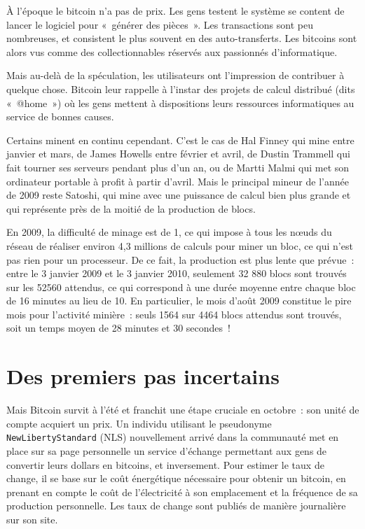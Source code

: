 
À l'époque le bitcoin n'a pas de prix. Les gens testent le système se content de lancer le logiciel pour «~générer des pièces~». Les transactions sont peu nombreuses, et consistent le plus souvent en des auto-transferts. Les bitcoins sont alors vus comme des collectionnables réservés aux passionnés d'informatique.

Mais au-delà de la spéculation, les utilisateurs ont l'impression de contribuer à quelque chose. Bitcoin leur rappelle à l'instar des projets de calcul distribué (dits «~@home~») où les gens mettent à dispositions leurs ressources informatiques au service de bonnes causes.

Certains minent en continu cependant. C'est le cas de Hal Finney qui mine entre janvier et mars, de James Howells entre février et avril, de Dustin Trammell qui fait tourner ses serveurs pendant plus d'un an, ou de Martti Malmi qui met son ordinateur portable à profit à partir d'avril. Mais le principal mineur de l'année de 2009 reste Satoshi, qui mine avec une puissance de calcul bien plus grande et qui représente près de la moitié de la production de blocs.

En 2009, la difficulté de minage est de 1, ce qui impose à tous les nœuds du réseau de réaliser environ 4,3 millions de calculs pour miner un bloc, ce qui n'est pas rien pour un processeur. De ce fait, la production est plus lente que prévue~: entre le 3 janvier 2009 et le 3 janvier 2010, seulement 32 880 blocs sont trouvés sur les 52560 attendus, ce qui correspond à une durée moyenne entre chaque bloc de 16 minutes au lieu de 10. En particulier, le mois d'août 2009 constitue le pire mois pour l'activité minière~: seuls 1564 sur 4464 blocs attendus sont trouvés, soit un temps moyen de 28 minutes et 30 secondes~!


\section{Des premiers pas incertains}

Mais Bitcoin survit à l'été et franchit une étape cruciale en octobre~: son unité de compte acquiert un prix. Un individu utilisant le pseudonyme \verb?NewLibertyStandard? (NLS) nouvellement arrivé dans la communauté met en place sur sa page personnelle un service d'échange permettant aux gens de convertir leurs dollars en bitcoins, et inversement. Pour estimer le taux de change, il se base sur le coût énergétique nécessaire pour obtenir un bitcoin, en prenant en compte le coût de l'électricité à son emplacement et la fréquence de sa production personnelle. Les taux de change sont publiés de manière journalière sur son site.

